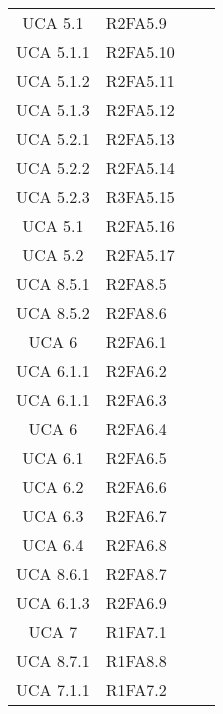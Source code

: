 {\begin{longtable}{ c C{4cm} c c}
UCA 5.1 & R2FA5.9\\

UCA 5.1.1 & R2FA5.10\\

UCA 5.1.2 & R2FA5.11\\


UCA 5.1.3 & R2FA5.12\\

UCA 5.2.1 & R2FA5.13\\

UCA 5.2.2 & R2FA5.14\\

UCA 5.2.3 & R3FA5.15\\

UCA 5.1 & R2FA5.16\\

UCA 5.2 & R2FA5.17\\

UCA 8.5.1 & R2FA8.5\\

UCA 8.5.2 & R2FA8.6\\

UCA 6 & R2FA6.1\\


UCA 6.1.1 & R2FA6.2\\

UCA 6.1.1 & R2FA6.3\\

UCA 6 & R2FA6.4\\

UCA 6.1 & R2FA6.5\\

UCA 6.2 & R2FA6.6\\

UCA 6.3 & R2FA6.7\\

UCA 6.4 & R2FA6.8\\


UCA 8.6.1 & R2FA8.7\\

UCA 6.1.3 & R2FA6.9\\

UCA 7 & R1FA7.1\\

UCA 8.7.1 & R1FA8.8\\

UCA 7.1.1 & R1FA7.2\\


\end{longtable}}
